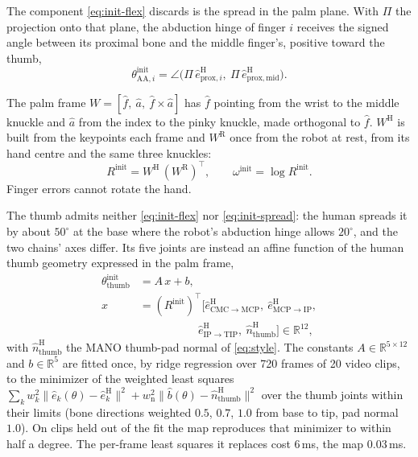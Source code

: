  The component \cref{eq:init-flex} discards is the spread in the palm plane. With $\Pi$ the projection onto that plane, the abduction hinge of finger $i$ receives the signed angle between its proximal bone and the middle finger's, positive toward the thumb,
\begin{equation}
\label{eq:init-spread}
\theta^{\mathrm{init}}_{\mathrm{AA},i} = \angle\big(\Pi\,\hat{e}^{\mathrm{H}}_{\mathrm{prox},i},\ \Pi\,\hat{e}^{\mathrm{H}}_{\mathrm{prox},\mathrm{mid}}\big).
\end{equation}

 The palm frame $W = [\hat{f},\ \hat{a},\ \hat{f} \times \hat{a}]$ has $\hat{f}$ pointing from the wrist to the middle knuckle and $\hat{a}$ from the index to the pinky knuckle, made orthogonal to $\hat{f}$. $W^{\mathrm{H}}$ is built from the keypoints each frame and $W^{\mathrm{R}}$ once from the robot at rest, from its hand centre and the same three knuckles:
\begin{equation}
\label{eq:init-wrist}
R^{\mathrm{init}} = W^{\mathrm{H}}\,(W^{\mathrm{R}})^{\top}, \qquad \omega^{\mathrm{init}} = \log R^{\mathrm{init}}.
\end{equation}
Finger errors cannot rotate the hand.

 The thumb admits neither \cref{eq:init-flex} nor \cref{eq:init-spread}: the human spreads it by about $50^\circ$ at the base where the robot's abduction hinge allows $20^\circ$, and the two chains' axes differ. Its five joints are instead an affine function of the human thumb geometry expressed in the palm frame,
\begin{equation}
\label{eq:init-thumb}
\begin{aligned}
\theta^{\mathrm{init}}_{\mathrm{thumb}} &= A\,x + b, \\
x &= (R^{\mathrm{init}})^{\top}\big[\hat{e}^{\mathrm{H}}_{\mathrm{CMC}\to\mathrm{MCP}},\ \hat{e}^{\mathrm{H}}_{\mathrm{MCP}\to\mathrm{IP}}, \\
&\qquad\qquad\quad\ \hat{e}^{\mathrm{H}}_{\mathrm{IP}\to\mathrm{TIP}},\ \hat{n}^{\mathrm{H}}_{\mathrm{thumb}}\big] \in \mathbb{R}^{12},
\end{aligned}
\end{equation}
with $\hat{n}^{\mathrm{H}}_{\mathrm{thumb}}$ the MANO thumb-pad normal of \cref{eq:style}. The constants $A \in \mathbb{R}^{5\times 12}$ and $b \in \mathbb{R}^5$ are fitted once, by ridge regression over 720 frames of 20 video clips, to the minimizer of the weighted least squares $\sum_k w_k^2 \|\hat{e}_k(\theta) - \hat{e}^{\mathrm{H}}_k\|^2 + w_{\mathrm{n}}^2 \|\hat{b}(\theta) - \hat{n}^{\mathrm{H}}_{\mathrm{thumb}}\|^2$ over the thumb joints within their limits (bone directions weighted $0.5$, $0.7$, $1.0$ from base to tip, pad normal $1.0$). On clips held out of the fit the map reproduces that minimizer to within half a degree. The per-frame least squares it replaces cost $6$\,ms, the map $0.03$\,ms.

